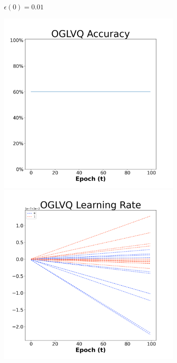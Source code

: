 \begin{figure}[H]
\begin{subfigure}{0.3\textwidth}
\caption{$\epsilon(0)=0.01$}
\end{subfigure}\hfil %
\begin{subfigure}{0.3\textwidth}
\includegraphics[width=\linewidth]{images/exper1/NSP/OGLVQ_0.03_acc.png}
\includegraphics[width=\linewidth]{images/exper1/NSP/OGLVQ_0.03_lr.png}

\end{subfigure}
\end{figure}
